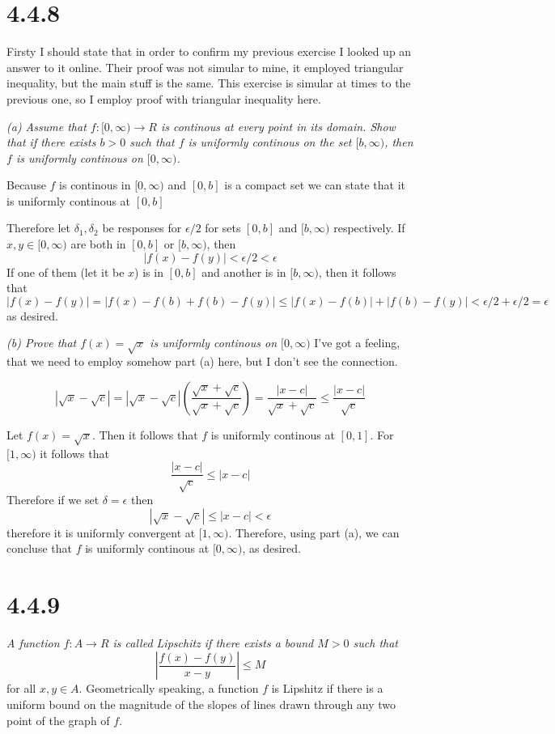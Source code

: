 \documentclass[11pt,oneside,titlepage]{book}
\begin{document}
\section*{4.4.8}
Firsty I should state that in order to confirm my previous exercise I looked
up an answer to it online. Their proof was not simular to mine, it employed
triangular inequality, but the main stuff is the same. This exercise is
simular at times to the previous one, so I employ proof with triangular
inequality here.

\textit{(a) Assume that $f: [0, \infty) \to R$ is continous at every point in
  its domain. Show that if there exists $b > 0$ such that $f$ is uniformly
  continous on the set $[b, \infty)$, then $f$ is uniformly continous on
  $[0, \infty)$.}

Because $f$ is continous in $[0, \infty)$ and $[0, b]$ is a
compact set we can state that
it is uniformly continous at $[0, b]$

Therefore let $\delta_1, \delta_2$ be responses for $\epsilon / 2$ for
sets $[0, b]$ and $[b, \infty)$ respectively. If $x, y \in [0, \infty)$ are
both in $[0, b]$ or $[b, \infty)$, then
$$|f(x) - f(y)| < \epsilon / 2 < \epsilon$$
If one of them (let it be $x$) is in $[0, b]$ and another is in $[b, \infty)$,
then it follows that
$$|f(x) - f(y)| = |f(x) - f(b) + f(b) - f(y)| \leq
|f(x) - f(b)| + |f(b) - f(y)| < \epsilon/2 + \epsilon/2 = \epsilon$$
as desired.

\textit{(b) Prove that $f(x) = \sqrt{x}$ is uniformly continous on
  $[0, \infty)$}
I've got a feeling, that we need to employ somehow part (a) here, but I don't
see the connection.

$$|\sqrt{x} - \sqrt{c}| =
|\sqrt{x} - \sqrt{c}|\left(\frac{\sqrt{x} + \sqrt{c}}{\sqrt{x} +
    \sqrt{c}}\right) = 
\frac{|x - c|}{\sqrt{x} + \sqrt{c}} \leq  \frac{|x - c|}{\sqrt{c}}  $$

Let $f(x) = \sqrt{x}$. Then it follows that $f$ is uniformly continous at
$[0, 1]$. For $[1, \infty)$ it follows that
$$\frac{|x - c|}{\sqrt{c}} \leq |x - c|$$
Therefore if we set $\delta = \epsilon$ then
$$|\sqrt{x} - \sqrt{c}| \leq |x - c| < \epsilon$$
therefore it is uniformly convergent at $[1, \infty)$.
Therefore, using part (a), we can concluse that $f$ is uniformly continous at
$[0, \infty)$, as desired.

\section*{4.4.9}
\textit{A function $f: A \to R$ is called Lipschitz if there exists a bound
  $M > 0$ such that }
$$\left|\frac{f(x) - f(y)}{x - y}\right| \leq M$$
for all $x, y \in A$. Geometrically speaking, a function $f$ is Lipshitz if
there is a uniform  bound on the magnitude of the slopes of lines drawn
through any two point of the graph of $f$.
\end{document}
